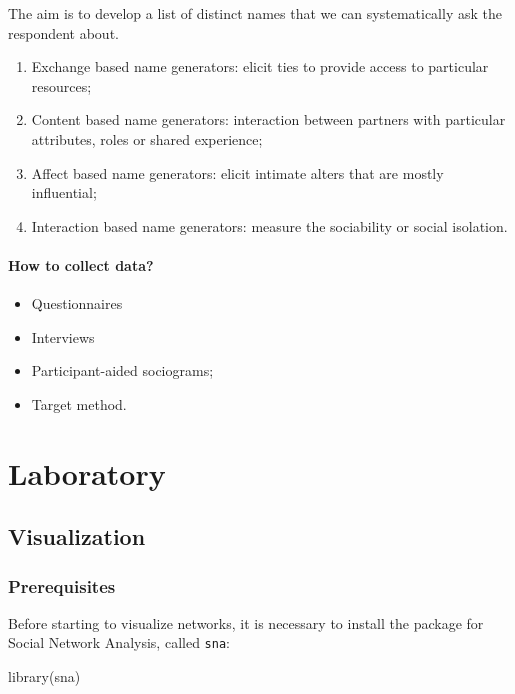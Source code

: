 \documentclass[
  notitlepage,
  onecolumn,
  openany]{book}
\newenvironment{Shaded}{\begin{snugshade}}{\end{snugshade}}
\newcommand{\FunctionTok}[1]{\textcolor[rgb]{0.00,0.00,0.00}{#1}}
\newcommand{\NormalTok}[1]{#1}
\providecommand{\tightlist}{%
  \setlength{\itemsep}{0pt}\setlength{\parskip}{0pt}}
\begin{document}
The aim is to develop a list of distinct names that we can systematically ask the respondent about.

\begin{enumerate}
\def\labelenumi{\arabic{enumi}.}
\tightlist
\item
  Exchange based name generators: elicit ties to provide access to particular resources;
\item
  Content based name generators: interaction between partners with particular attributes, roles or shared experience;
\item
  Affect based name generators: elicit intimate alters that are mostly influential;
\item
  Interaction based name generators: measure the sociability or social isolation.
\end{enumerate}

\hypertarget{how-to-collect-data}{%
\subsection{How to collect data?}\label{how-to-collect-data}}

\begin{itemize}
\tightlist
\item
  Questionnaires
\item
  Interviews
\item
  Participant-aided sociograms;
\item
  Target method.
\end{itemize}

\part{Laboratory}

\hypertarget{visualization}{%
\chapter{Visualization}\label{visualization}}

\hypertarget{prerequisites}{%
\section{Prerequisites}\label{prerequisites}}

Before starting to visualize networks, it is necessary to install the package for Social Network Analysis, called \texttt{sna}:

\begin{Shaded}
\begin{Highlighting}[]
\FunctionTok{library}\NormalTok{(sna)}
\end{Highlighting}
\end{Shaded}
\end{document}
